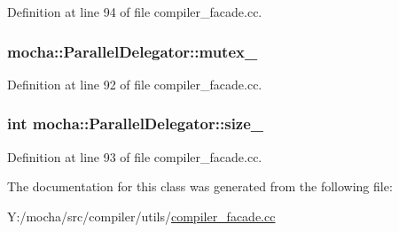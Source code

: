 Definition at line 94 of file compiler\_\-facade.cc.

\hypertarget{classmocha_1_1_parallel_delegator_a2c38b22fc40feeb514cc1f8a4d5cb048}{
\subsubsection[{mutex\_\-}]{ {\bf mocha::ParallelDelegator::mutex\_\-}}}
\label{classmocha_1_1_parallel_delegator_a2c38b22fc40feeb514cc1f8a4d5cb048}


Definition at line 92 of file compiler\_\-facade.cc.

\hypertarget{classmocha_1_1_parallel_delegator_a0e515694189bd08d422c720052d21689}{
\subsubsection[{size\_\-}]{\setlength{\rightskip}{0pt plus 5cm}int {\bf mocha::ParallelDelegator::size\_\-}}}
\label{classmocha_1_1_parallel_delegator_a0e515694189bd08d422c720052d21689}


Definition at line 93 of file compiler\_\-facade.cc.



The documentation for this class was generated from the following file:\begin{DoxyCompactItemize}
\item 
Y:/mocha/src/compiler/utils/\hyperlink{compiler__facade_8cc}{compiler\_\-facade.cc}\end{DoxyCompactItemize}

